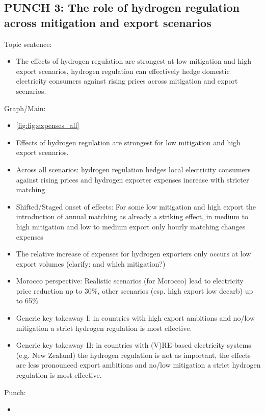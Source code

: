 \subsection{PUNCH 3: The role of hydrogen regulation across mitigation and export scenarios}
\label{subsec:rule_all}

Topic sentence:
\begin{itemize}
    \item The effects of hydrogen regulation are strongest at low mitigation and high export scenarios, hydrogen regulation can effectively hedge domestic electricity consumers against rising prices across mitigation and export scenarios.
\end{itemize}

Graph/Main:
\begin{itemize}
    \item \ref{fig:fig:expenses_all} 
    \item Effects of hydrogen regulation are strongest for low mitigation and high export scenarios.
    \item Across all scenarios: hydrogen regulation hedges local electricity consumers against rising prices and hydrogen exporter expenses increase with stricter matching
    \item Shifted/Staged onset of effects: For some low mitigation and high export the introduction of annual matching as already a striking effect, in medium to high mitigation and low to medium export only hourly matching changes expenses
    \item The relative increase of expenses for hydrogen exporters only occurs at low export volumes (clarify: and which mitigation?)
    \item Morocco perspective: Realistic scenarios (for Morocco) lead to electricity price reduction up to 30\%, other scenarios (esp. high export low decarb) up to 65\%
    \item Generic key takeaway I: in countries with high export ambitions and no/low mitigation a strict hydrogen regulation is most effective.
    \item Generic key takeaway II: in countries with (V)RE-based electricity systems (e.g. New Zealand) the hydrogen regulation is not as important, the effects are less pronounced
    export ambitions and no/low mitigation a strict hydrogen regulation is most effective.
\end{itemize}

Punch: 
\begin{itemize}
    \item 
\end{itemize}


